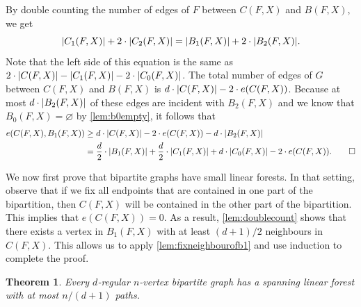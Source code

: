\documentclass[11pt]{article}
\makeatletter
\theoremstyle{plain}
\newtheorem{theorem}{Theorem}[section]
\theoremstyle{definition}
\renewenvironment{proof}[1][\proofname]
{\par\pushQED{\qed}
	\normalfont\topsep6\p@\@plus6\p@\relax\trivlist
	\item[\hskip\labelsep\bfseries#1\@addpunct{.}]
	\ignorespaces}
{\popQED\endtrivlist\@endpefalse}
\let\emptyset\varnothing
\DeclarePairedDelimiter{\abs}{\lvert}{\rvert}
\makeatother
\begin{document}
\begin{proof}
    By double counting the number of edges of $F$ between $C(F,X)$ and $B(F,X)$, we get
    \[
        \abs{C_1(F,X)} + 2 \cdot \abs{C_2(F,X)} = \abs{B_1(F,X)} + 2 \cdot \abs{B_2(F,X)}.
    \]
    Note that the left side of this equation is the same as $2 \cdot \abs{C(F,X)} - \abs{C_1(F,X)} - 2 \cdot \abs{C_0(F,X)}$. The total number of edges of $G$ between $C(F,X)$ and $B(F,X)$ is $d \cdot \abs{C(F,X)} - 2 \cdot e(C(F,X))$. Because at most $d \cdot \abs{B_2(F,X)}$ of these edges are incident with $B_2(F,X)$ and we know that $B_0(F,X) = \emptyset$ by \cref{lem:b0empty}, it follows that
    \begin{align*}
        e(C(F,X),B_1(F,X)) & \ge d \cdot \abs{C(F,X)} - 2 \cdot e(C(F,X)) - d \cdot \abs{B_2(F,X)} \\
        & = \frac{d}{2} \cdot \abs{B_1(F,X)} + \frac{d}{2} \cdot \abs{C_1(F,X)} + d \cdot \abs{C_0(F,X)} - 2 \cdot e(C(F,X)). \qedhere
    \end{align*}
\end{proof}

We now first prove that bipartite graphs have small linear forests. In that setting, observe that if we fix all endpoints that are contained in one part of the bipartition, then $C(F,X)$ will be contained in the other part of the bipartition. This implies that $e(C(F,X)) = 0$. As a result, \cref{lem:doublecount} shows that there exists a vertex in $B_1(F,X)$ with at least $(d+1)/2$ neighbours in $C(F,X)$. This allows us to apply \cref{lem:fixneighbourofb1} and use induction to complete the proof.

\begin{theorem}\label{thm:smalllinearforestbipartite}
    Every $d$-regular $n$-vertex bipartite graph has a spanning linear forest with at most $n / (d+1)$ paths.
\end{theorem}
\end{document}
